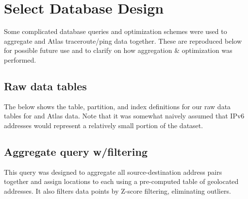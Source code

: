 \chapter{Select Database Design}\label{app:db-queries}

Some complicated database queries and optimization schemes were used to aggregate \caida and \ripe Atlas traceroute/ping data together. These are reproduced below for possible future use and to clarify on how aggregation \& optimization was performed.
 
\section{Raw data tables}
The below shows the table, partition, and index definitions for our raw data tables for \caida and \ripe Atlas data. Note that it was somewhat naively assumed that IPv6 addresses would represent a relatively small portion of the dataset.


\section{Aggregate query w/filtering}

This query was designed to aggregate all source-destination \ip address pairs together and assign locations to each using a pre-computed table of geolocated addresses. It also filters data points by Z-score filtering, eliminating outliers.


